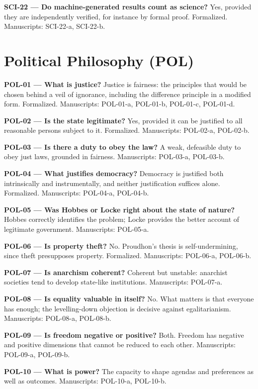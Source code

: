 \documentclass[10pt]{article}
\begin{document}
\textbf{SCI-22 --- Do machine-generated results count as science?} Yes, provided they are independently verified, for instance by formal proof. Formalized. Manuscripts: SCI-22-a, SCI-22-b.

\section*{Political Philosophy (POL)}
\textbf{POL-01 --- What is justice?} Justice is fairness: the principles that would be chosen behind a veil of ignorance, including the difference principle in a modified form. Formalized. Manuscripts: POL-01-a, POL-01-b, POL-01-c, POL-01-d.

\textbf{POL-02 --- Is the state legitimate?} Yes, provided it can be justified to all reasonable persons subject to it. Formalized. Manuscripts: POL-02-a, POL-02-b.

\textbf{POL-03 --- Is there a duty to obey the law?} A weak, defeasible duty to obey just laws, grounded in fairness. Manuscripts: POL-03-a, POL-03-b.

\textbf{POL-04 --- What justifies democracy?} Democracy is justified both intrinsically and instrumentally, and neither justification suffices alone. Formalized. Manuscripts: POL-04-a, POL-04-b.

\textbf{POL-05 --- Was Hobbes or Locke right about the state of nature?} Hobbes correctly identifies the problem; Locke provides the better account of legitimate government. Manuscripts: POL-05-a.

\textbf{POL-06 --- Is property theft?} No. Proudhon's thesis is self-undermining, since theft presupposes property. Formalized. Manuscripts: POL-06-a, POL-06-b.

\textbf{POL-07 --- Is anarchism coherent?} Coherent but unstable: anarchist societies tend to develop state-like institutions. Manuscripts: POL-07-a.

\textbf{POL-08 --- Is equality valuable in itself?} No. What matters is that everyone has enough; the levelling-down objection is decisive against egalitarianism. Manuscripts: POL-08-a, POL-08-b.

\textbf{POL-09 --- Is freedom negative or positive?} Both. Freedom has negative and positive dimensions that cannot be reduced to each other. Manuscripts: POL-09-a, POL-09-b.

\textbf{POL-10 --- What is power?} The capacity to shape agendas and preferences as well as outcomes. Manuscripts: POL-10-a, POL-10-b.
\end{document}
